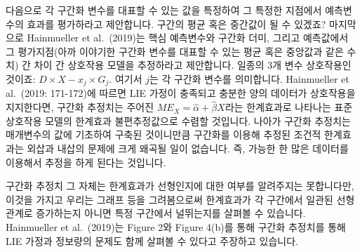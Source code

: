 \documentclass[
]{book}
\begin{document}
다음으로 각 구간화 변수를 대표할 수 있는 값을 특정하여 그 특정한 지점에서 예측변수의 효과를 평가하라고 제안합니다. 구간의 평균 혹은 중간값이 될 수 있겠죠? 마지막으로 Hainmueller et al.~(2019)는 핵심 예측변수와 구간화 더미, 그리고 예측값에서 그 평가지점(아까 이야기한 구간화 변수를 대표할 수 있는 평균 혹은 중앙값과 같은 수치) 간 차이 간 상호작용 모델을 추정하라고 제안합니다. 일종의 3개 변수 상호작용인 것이죠: \(D \times X - x_j \times G_j\). 여기서 \(j\)는 각 구간화 변수를 의미합니다. Hainmueller et al.~(2019: 171-172)에 따르면 LIE 가정이 충족되고 충분한 양의 데이터가 상호작용을 지지한다면, 구간화 추정치는 주어진 \(ME_X = \hat{\alpha} + \hat{\beta}X\)라는 한계효과로 나타나는 표준 상호작용 모델의 한계효과 불편추정값으로 수렴할 것입니다. 나아가 구간화 추정치는 매개변수의 값에 기초하여 구축된 것이니만큼 구간화를 이용해 추정된 조건적 한계효과는 외삽과 내삽의 문제에 크게 왜곡될 일이 없습니다. 즉, 가능한 한 많은 데이터를 이용해서 추정을 하게 된다는 것입니다.

구간화 추정치 그 자체는 한계효과가 선형인지에 대한 여부를 알려주지는 못합니다만, 이것을 가지고 우리는 그래프 등을 그려봄으로써 한계효과가 각 구간에서 일관된 선형 관계로 증가하는지 아니면 특정 구간에서 널뛰는지를 살펴볼 수 있습니다. Hainmueller et al.~(2019)는 Figure 2와 Figure 4(b)를 통해 구간화 추정치를 통해 LIE 가정과 정보량의 문제도 함께 살펴볼 수 있다고 주장하고 있습니다.

  
\end{document}
